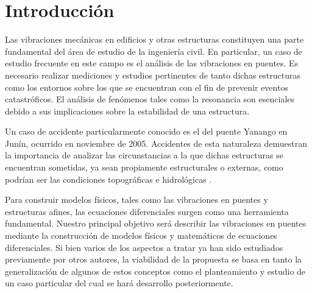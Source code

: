\section{Introducción}

Las vibraciones mecánicas en edificios y otras estructuras constituyen una parte fundamental del área de estudio de la ingeniería civil. En particular, un caso de estudio frecuente en este campo es el análisis de las vibraciones en puentes. Es necesario realizar mediciones y estudios pertinentes de tanto dichas estructuras como los entornos sobre los que se encuentran con el fin de prevenir eventos catastróficos. El análisis de fenómenos tales como la resonancia son esenciales debido a sus implicaciones sobre la estabilidad de una estructura.

Un caso de accidente particularmente conocido es el del puente Yanango en Junín, ocurrido en noviembre de 2005. Accidentes de esta naturaleza demuestran la importancia de analizar las circunstancias a la que dichas estructuras se encuentran sometidas, ya sean propiamente estructurales o externas, como podrían ser las condiciones topográficas e hidrológicas \citep{mayhua}.

Para construir modelos físicos, tales como las vibraciones en puentes y estructuras afines, las ecuaciones diferenciales surgen como una herramienta fundamental. Nuestro principal objetivo será describir las vibraciones en puentes mediante la construcción de modelos físicos y matemáticos de ecuaciones diferenciales. Si bien varios de los aspectos a tratar ya han sido estudiados previamente por otros autores, la viabilidad de la propuesta se basa en tanto la generalización de algunos de estos conceptos como el planteamiento y estudio de un caso particular del cual se hará desarrollo posteriormente.